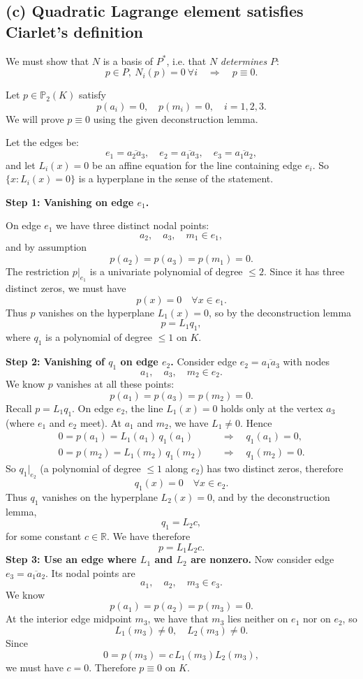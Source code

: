 \subsection*{(c) Quadratic Lagrange element satisfies Ciarlet's definition}
We must show that \(N\) is a basis of \(P^\ast\), i.e. that \(N\) \emph{determines} \(P\):
\[
    p\in P,\ N_i(p)=0\ \forall i \quad\Longrightarrow\quad p\equiv 0.
\]

Let \(p\in\mathbb{P}_2(K)\) satisfy
\[
    p(a_i)=0,\quad p(m_i)=0,\quad i=1,2,3.
\]
We will prove \(p\equiv 0\) using the given deconstruction lemma.

Let the edges be:
\[
    e_1 = \overline{a_2a_3},\quad e_2 = \overline{a_1a_3},\quad e_3 = \overline{a_1a_2},
\]
and let \(L_i(x)=0\) be an affine equation for the line containing edge \(e_i\). So
\(\{x:L_i(x)=0\}\) is a hyperplane in the sense of the statement.

\textbf{Step 1: Vanishing on edge \(e_1\).}

On edge \(e_1\) we have three distinct nodal points:
\[
    a_2,\quad a_3,\quad m_1\in e_1,
\]
and by assumption
\[
    p(a_2)=p(a_3)=p(m_1)=0.
\]
The restriction \(p|_{e_1}\) is a univariate polynomial of degree \(\le 2\).
Since it has three distinct zeros, we must have
\[
    p(x) = 0 \quad\forall x\in e_1.
\]
Thus \(p\) vanishes on the hyperplane \(L_1(x)=0\), so by the deconstruction lemma
\[
    p = L_1 q_1,
\]
where \(q_1\) is a polynomial of degree \(\le 1\) on \(K\).

\textbf{Step 2: Vanishing of \(q_1\) on edge \(e_2\).}
Consider edge \(e_2 = \overline{a_1a_3}\) with nodes
\[
    a_1,\quad a_3,\quad m_2\in e_2.
\]
We know \(p\) vanishes at all these points:
\[
    p(a_1)=p(a_3)=p(m_2)=0.
\]
Recall \(p = L_1 q_1\). On edge \(e_2\), the line \(L_1(x)=0\) holds only at the vertex
\(a_3\) (where \(e_1\) and \(e_2\) meet). At \(a_1\) and \(m_2\), we have \(L_1\neq 0\).
Hence
\[
\begin{aligned}
    0 = p(a_1) = L_1(a_1)\,q_1(a_1) &\quad\Longrightarrow\quad q_1(a_1) = 0, \\
    0 = p(m_2) = L_1(m_2)\,q_1(m_2) &\quad\Longrightarrow\quad q_1(m_2) = 0.
\end{aligned}
\]
So \(q_1|_{e_2}\) (a polynomial of degree \(\le 1\) along \(e_2\)) has two distinct zeros,
therefore
\[
    q_1(x) = 0 \quad\forall x\in e_2.
\]
Thus \(q_1\) vanishes on the hyperplane \(L_2(x)=0\), and by the deconstruction lemma,
\[
    q_1 = L_2 c,
\]
for some constant \(c\in\mathbb{R}\). We have therefore
\[
    p = L_1 L_2 c.
\]
\textbf{Step 3: Use an edge where \(L_1\) and \(L_2\) are nonzero.}
Now consider edge \(e_3 = \overline{a_1a_2}\). Its nodal points are
\[
    a_1,\quad a_2,\quad m_3\in e_3.
\]
We know
\[
    p(a_1)=p(a_2)=p(m_3)=0.
\]
At the interior edge midpoint \(m_3\), we have that \(m_3\) lies neither on \(e_1\) nor on
\(e_2\), so
\[
    L_1(m_3)\neq 0,\quad L_2(m_3)\neq 0.
\]
Since
\[
    0 = p(m_3) = c\,L_1(m_3)L_2(m_3),
\]
we must have \(c=0\). Therefore \(p \equiv 0\) on \(K\).


